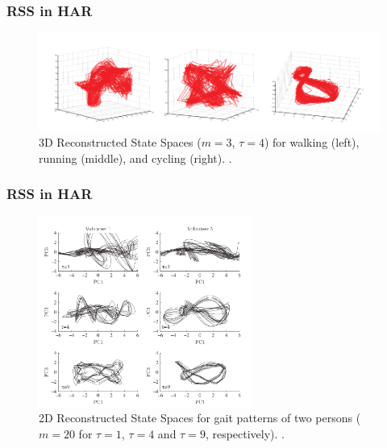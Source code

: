 \documentclass{beamer}
\begin{document}
\begin{frame}
\frametitle{RSS in HAR}
\vspace{-0.7cm}


\begin{figure}[!htb]
\centering
\includegraphics[width=1.05\textwidth]{frank_2012}
\caption[PA]{3D Reconstructed State Spaces ($m=3$, $\tau=4$) for walking (left), running (middle), and cycling (right).
 \textcolor{red}{\textbf{ \cite{Frank2010,Frank2012} }}.
}
\label{fig:sn}
\end{figure}

\end{frame}




\begin{frame}
\frametitle{RSS in HAR}
\vspace{-0.7cm}

\begin{figure}[!htb]
\centering
\includegraphics[width=0.625\textwidth]{sama_2013}
\caption[PA]{2D Reconstructed State Spaces for gait patterns of two persons ($m=20$ for $\tau=1$, $\tau=4$ and $\tau=9$, respectively).
 \textcolor{red}{\textbf{ \cite{Sama2013} }}.
}
\label{fig:sn}
\end{figure}



\end{frame}
\end{document}

